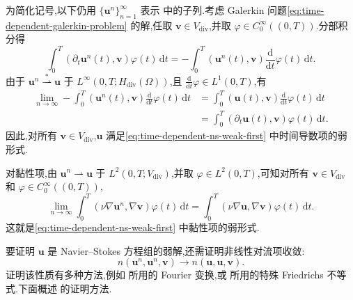 \begin{note}\label{note:time-dependent-galerkin-linear-convergence}
为简化记号,以下仍用 $\{\bm{u}^n\}_{n=1}^\infty$ 表示 中的子列.考虑 Galerkin 问题\cref{eq:time-dependent-galerkin-problem} 的解,任取 $\bm{v}\in V_{\mathrm{div}}$,并取 $\varphi\in C_0^\infty((0,T))$.分部积分得
\[
  \int_0^T(\partial_t\bm{u}^n(t),\bm{v})\varphi(t)\,\mathrm{d}t
    =-\int_0^T(\bm{u}^n(t),\bm{v})
        \frac{\mathrm{d}}{\mathrm{d}t}\varphi(t)\,\mathrm{d}t.
\]
由于 $\bm{u}^n\stackrel{*}{\rightharpoonup}\bm{u}$ 于
$L^\infty(0,T;H_{\mathrm{div}}(\Omega))$,且
$\frac{\mathrm{d}}{\mathrm{d}t}\varphi\in L^1(0,T)$,有
\[
\begin{aligned}
  \lim_{n\to\infty}-\int_0^T(\bm{u}^n(t),\bm{v})
      \frac{\mathrm{d}}{\mathrm{d}t}\varphi(t)\,\mathrm{d}t
    &=\int_0^T(\bm{u}(t),\bm{v})
      \frac{\mathrm{d}}{\mathrm{d}t}\varphi(t)\,\mathrm{d}t\\
    &=\int_0^T(\partial_t\bm{u}(t),\bm{v})
      \varphi(t)\,\mathrm{d}t.
\end{aligned}
\]
因此,对所有 $\bm{v}\in V_{\mathrm{div}}$,$\bm{u}$ 满足\cref{eq:time-dependent-ns-weak-first} 中时间导数项的弱形式.

对黏性项,由 $\bm{u}^n\rightharpoonup\bm{u}$ 于 $L^2(0,T;V_{\mathrm{div}})$,并取 $\varphi\in L^2(0,T)$,可知对所有 $\bm{v}\in V_{\mathrm{div}}$ 和 $\varphi\in C_0^\infty((0,T))$,
\begin{equation}\label{eq:time-dependent-galerkin-viscous-convergence}
  \lim_{n\to\infty}\int_0^T
     (\nu\nabla\bm{u}^n,\nabla\bm{v})\varphi(t)\,\mathrm{d}t
    =\int_0^T(\nu\nabla\bm{u},\nabla\bm{v})
       \varphi(t)\,\mathrm{d}t.
\end{equation}
这就是\cref{eq:time-dependent-ns-weak-first} 中黏性项的弱形式.

要证明 $\bm{u}$ 是 Navier--Stokes 方程组的弱解,还需证明非线性对流项收敛:
\[
  n(\bm{u}^n,\bm{u}^n,\bm{v})
    \longrightarrow n(\bm{u},\bm{u},\bm{v}).
\]
证明该性质有多种方法,例如\textcite[第 285 页]{Temam1984} 所用的 Fourier 变换,或\textcite{Galdi2000} 所用的特殊 Friedrichs 不等式.下面概述\textcite[第 161 页]{GiraultRaviart1979} 的证明方法.
\end{note}

